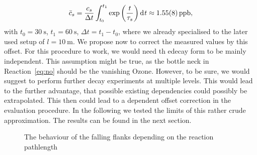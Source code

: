 \begin{align}
  \bar c_s = \frac{c_s}{\Delta t} \int_{t_0}^{t_1}
  \exp\left(\frac{t}{\tau_s}\right)\d[t] \approx \SI{1.55(8)}{ppb},\label{eq:offset}
\end{align}
with $t_0 = \SI{30}{\second}$, $t_1 = \SI{60}{\second}$, $\Delta t =
t_1 - t_0$, where we already specialised to the later used setup of $l
= \SI{10}{\meter}$. We propose now to correct the measured 
values by this offset. For this procedure to work, we would need th
edecay form to be mainly  independent. This assumption might be
true, as the bottle neck in Reaction~\eqref{eq:no} should be the
vanishing Ozone. However, to be sure, we would suggest to perform
further decay experiments at multiple  levels. This would lead
to the further advantage, that possible existing  dependencies
could possibly be extrapolated. This then could lead to a 
dependent offset correction in the evaluation procedure.
In the following we tested the limits of this rather crude
approximation. The results can be found in the next section.

\begin{figure}[htbp]
  \centering
  
  \caption{The behaviour of the falling flanks depending on the
    reaction pathlength}
  \label{fig:switch-pl}
\end{figure}


